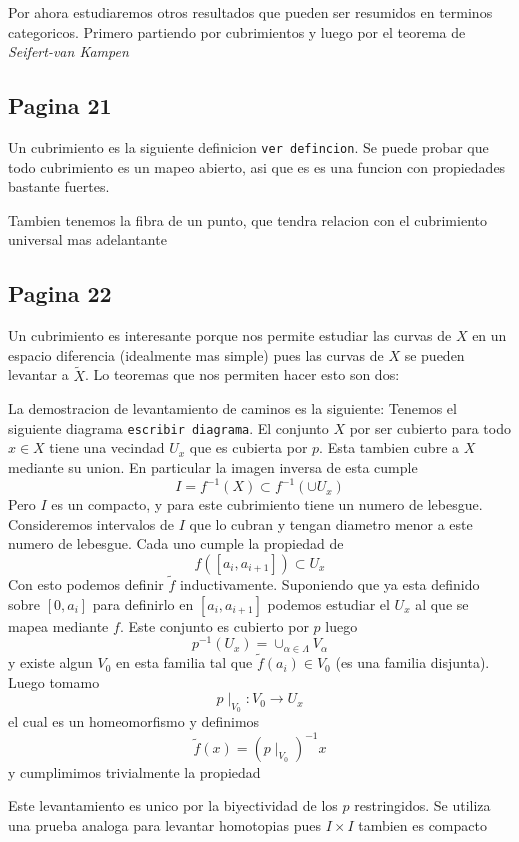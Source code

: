 \documentclass[letterpaper]{article}
\newcommand{\vank}{\emph{Seifert-van Kampen} }
\begin{document}
Por ahora estudiaremos otros resultados que pueden ser resumidos en
terminos categoricos. Primero partiendo por cubrimientos y luego por el
teorema de \vank

\subsection*{Pagina 21}
Un cubrimiento es la siguiente definicion \texttt{ver defincion}. Se
puede probar que todo cubrimiento es un mapeo abierto, asi que es es una
funcion con propiedades bastante fuertes.

Tambien tenemos la fibra de un punto, que tendra relacion con el
cubrimiento universal mas adelantante

\subsection*{Pagina 22}
Un cubrimiento es interesante porque nos permite estudiar las curvas de
\(X\) en un espacio diferencia (idealmente mas simple) pues las curvas
de \(X\) se pueden levantar a \(\tilde X\). Lo teoremas que nos permiten
hacer esto son dos:

La demostracion de levantamiento de caminos es la siguiente: Tenemos el
siguiente diagrama \texttt{escribir diagrama}. El conjunto \(X\) por ser
cubierto para todo \(x \in X\) tiene una vecindad \(U_x\) que es
cubierta por \(p\). Esta tambien cubre a \(X\) mediante su union. En
particular la imagen inversa de esta cumple
\[ I = f^{-1} (X) \subset f^{-1} (\cup U_x )\]
Pero \(I\) es un compacto, y para este cubrimiento tiene un numero de
lebesgue. Consideremos intervalos de \(I\) que lo cubran y tengan
diametro menor a este numero de lebesgue. Cada uno cumple la propiedad
de
\[ f([a_i, a_{i+1}]) \subset U_x \]
Con esto podemos definir \(\tilde f\) inductivamente. Suponiendo que ya
esta definido sobre \([0,a_i]\) para definirlo en \([a_i , a_{i+1}]\)
podemos estudiar el \(U_x\) al que se mapea mediante \(f\). Este
conjunto es cubierto por \(p\) luego
\[ p^{-1} (U_x) = \cup_{\alpha \in \Lambda} V_\alpha \]
y existe algun \(V_0\) en esta familia tal que \(\tilde f (a_i) \in
V_0\) (es una familia disjunta). Luego tomamo
\[ p \mid_{V_0} : V_0 \to U_x \]
el cual es un homeomorfismo y definimos
\[ \tilde f (x) = (p \mid_{V_0})^{-1} x \]
y cumplimimos trivialmente la propiedad

Este levantamiento es unico por la biyectividad de los \(p\)
restringidos. Se utiliza una prueba analoga para levantar homotopias
pues \(I \times I\) tambien es compacto
\end{document}
